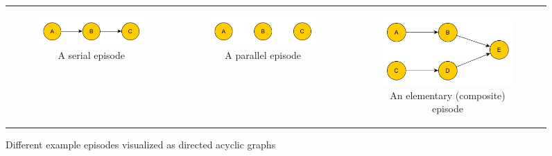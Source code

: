 \begin{figure}[H]
\centering
\begin{tabular}{c|c|c}
\begin{subfigure}{.3\textwidth}
  \centering
  \includegraphics[width=\linewidth]{exampleSerialEpisode}
  \caption{A serial episode}
  \label{fig:sub1}
\end{subfigure}%
&
\begin{subfigure}{.3\textwidth}
  \centering
  \includegraphics[width=\linewidth]{exampleParallelEpisode}
  \caption{A parallel episode}
  \label{fig:sub2}
\end{subfigure}
&
\begin{subfigure}{.3\textwidth}
  \centering
  \includegraphics[width=\linewidth]{exampleCompositeEpisode}
  \caption{An elementary (composite) episode}
  \label{fig:sub3}
\end{subfigure}
\end{tabular}
\caption{Different example episodes visualized as directed acyclic graphs}
\label{fig_exampleEpisodes}

\end{figure}

